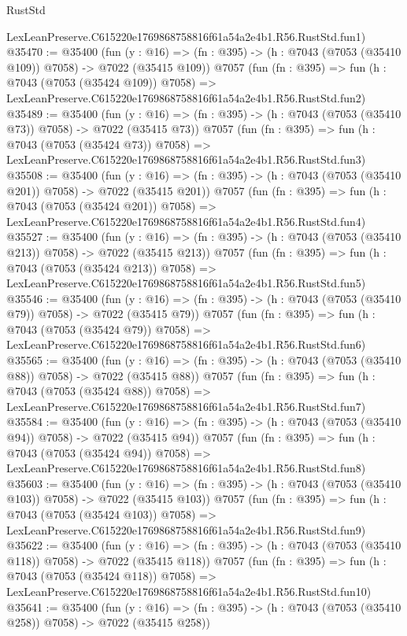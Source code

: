 \begin{lexlean}{RustStd}
\begin{coremodule}
    LexLeanPreserve.C615220e1769868758816f61a54a2e4b1.R56.RustStd.fun1)
@35470 := @35400
    (fun (y : @16) => (fn : @395) -> (h : @7043 (@7053 (@35410 @109)) @7058) -> @7022 (@35415 @109))
    @7057
    (fun (fn : @395) =>
    fun (h : @7043 (@7053 (@35424 @109)) @7058) =>
    LexLeanPreserve.C615220e1769868758816f61a54a2e4b1.R56.RustStd.fun2)
@35489 := @35400
    (fun (y : @16) => (fn : @395) -> (h : @7043 (@7053 (@35410 @73)) @7058) -> @7022 (@35415 @73))
    @7057
    (fun (fn : @395) =>
    fun (h : @7043 (@7053 (@35424 @73)) @7058) =>
    LexLeanPreserve.C615220e1769868758816f61a54a2e4b1.R56.RustStd.fun3)
@35508 := @35400
    (fun (y : @16) => (fn : @395) -> (h : @7043 (@7053 (@35410 @201)) @7058) -> @7022 (@35415 @201))
    @7057
    (fun (fn : @395) =>
    fun (h : @7043 (@7053 (@35424 @201)) @7058) =>
    LexLeanPreserve.C615220e1769868758816f61a54a2e4b1.R56.RustStd.fun4)
@35527 := @35400
    (fun (y : @16) => (fn : @395) -> (h : @7043 (@7053 (@35410 @213)) @7058) -> @7022 (@35415 @213))
    @7057
    (fun (fn : @395) =>
    fun (h : @7043 (@7053 (@35424 @213)) @7058) =>
    LexLeanPreserve.C615220e1769868758816f61a54a2e4b1.R56.RustStd.fun5)
@35546 := @35400
    (fun (y : @16) => (fn : @395) -> (h : @7043 (@7053 (@35410 @79)) @7058) -> @7022 (@35415 @79))
    @7057
    (fun (fn : @395) =>
    fun (h : @7043 (@7053 (@35424 @79)) @7058) =>
    LexLeanPreserve.C615220e1769868758816f61a54a2e4b1.R56.RustStd.fun6)
@35565 := @35400
    (fun (y : @16) => (fn : @395) -> (h : @7043 (@7053 (@35410 @88)) @7058) -> @7022 (@35415 @88))
    @7057
    (fun (fn : @395) =>
    fun (h : @7043 (@7053 (@35424 @88)) @7058) =>
    LexLeanPreserve.C615220e1769868758816f61a54a2e4b1.R56.RustStd.fun7)
@35584 := @35400
    (fun (y : @16) => (fn : @395) -> (h : @7043 (@7053 (@35410 @94)) @7058) -> @7022 (@35415 @94))
    @7057
    (fun (fn : @395) =>
    fun (h : @7043 (@7053 (@35424 @94)) @7058) =>
    LexLeanPreserve.C615220e1769868758816f61a54a2e4b1.R56.RustStd.fun8)
@35603 := @35400
    (fun (y : @16) => (fn : @395) -> (h : @7043 (@7053 (@35410 @103)) @7058) -> @7022 (@35415 @103))
    @7057
    (fun (fn : @395) =>
    fun (h : @7043 (@7053 (@35424 @103)) @7058) =>
    LexLeanPreserve.C615220e1769868758816f61a54a2e4b1.R56.RustStd.fun9)
@35622 := @35400
    (fun (y : @16) => (fn : @395) -> (h : @7043 (@7053 (@35410 @118)) @7058) -> @7022 (@35415 @118))
    @7057
    (fun (fn : @395) =>
    fun (h : @7043 (@7053 (@35424 @118)) @7058) =>
    LexLeanPreserve.C615220e1769868758816f61a54a2e4b1.R56.RustStd.fun10)
@35641 := @35400
    (fun (y : @16) => (fn : @395) -> (h : @7043 (@7053 (@35410 @258)) @7058) -> @7022 (@35415 @258))

\end{coremodule}
\end{lexlean}
